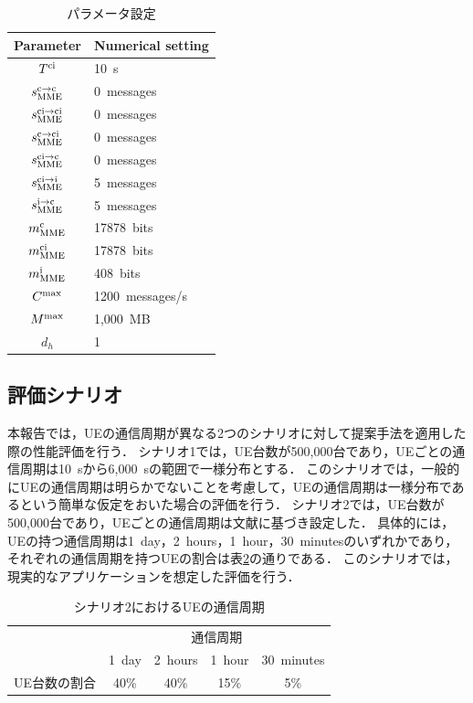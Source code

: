 \documentclass[technicalreport]{ieicej-rev}
\begin{document}
\begin{table}[!t]
  \centering
  \caption{パラメータ設定}
  \label{table:parameter}
  \begin{tabular}{c|l}
    \hline
    Parameter  & Numerical setting \\\hline \hline
    $T^{\rm ci}$ & 10~s\\
    $s_{\rm MME}^{\rm c \to \rm c}$ & 0~messages\\
    $s_{\rm MME}^{\rm ci \to \rm ci}$ & 0~messages\\
    $s_{\rm MME}^{\rm c \to \rm ci}$ & 0~messages\\
    $s_{\rm MME}^{\rm ci \to \rm c}$ & 0~messages\\
    $s_{\rm MME}^{\rm ci \to \rm i}$ & 5~messages\\
    $s_{\rm MME}^{\rm i \to \rm c}$ & 5~messages\\
    $m^{\rm c}_{\rm MME}$ & 17878~bits\\
    $m^{\rm ci}_{\rm MME}$ & 17878~bits\\
    $m^{\rm i}_{\rm MME}$ & 408~bits\\
    $C^{\rm max}$ & 1200~messages/s\\
    $M^{\rm max}$ & 1,000~MB\\
    $d_h$ & 1 \\\hline
  \end{tabular}
\end{table}

\subsection{評価シナリオ}
\label{sec:estimate4}
本報告では，UEの通信周期が異なる2つのシナリオに対して提案手法を適用した際の性能評価を行う．
シナリオ1では，UE台数が500,000台であり，UEごとの通信周期は10~sから6,000~sの範囲で一様分布とする．
このシナリオでは，一般的にUEの通信周期は明らかでないことを考慮して，UEの通信周期は一様分布であるという簡単な仮定をおいた場合の評価を行う．
シナリオ2では，UE台数が500,000台であり，UEごとの通信周期は文献\cite{3gpp.45.820}に基づき設定した．
具体的には，UEの持つ通信周期は1~day，2~hours，1~hour，30~minutesのいずれかであり，それぞれの通信周期を持つUEの割合は表\ref{table:interval}の通りである．
このシナリオでは，現実的なアプリケーションを想定した評価を行う．
\begin{table}[!t]
  \centering
  \caption{シナリオ2におけるUEの通信周期}
  \label{table:interval}
  \begin{tabular}{c|cccc}
    \hline
    &\multicolumn{4}{c}{通信周期} \\
    & 1~day & 2~hours & 1~hour & 30~minutes \\\hline \hline
    UE台数の割合 & 40\% & 40\% & 15\% & 5\% \\\hline
  \end{tabular}
\end{table}
\end{document}
